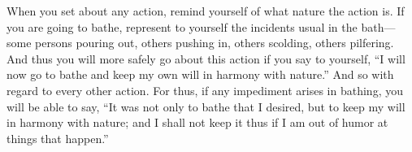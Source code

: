When you set about any action, remind yourself of what nature the action is. If
you  are going  to bathe,  represent  to yourself  the incidents  usual in  the
bath---some persons  pouring out,  others pushing  in, others  scolding, others
pilfering. And  thus you will more  safely go about  this action if you  say to
yourself,  ``I will  now go  to bathe  and  keep my  own will  in harmony  with
nature.'' And so with regard to every other action. For thus, if any impediment
arises in bathing, you  will be able to say, ``It was not  only to bathe that I
desired, but to  keep my will in harmony  with nature; and I shall  not keep it
thus if I am out of humor at things that happen.''
